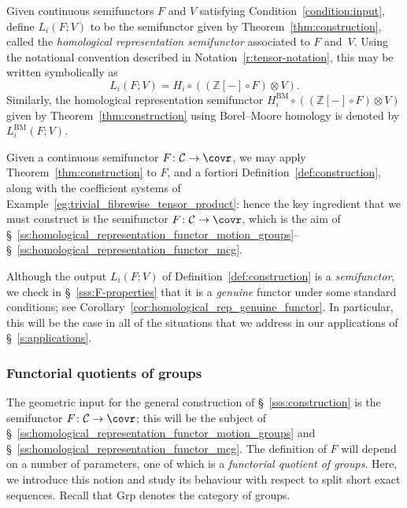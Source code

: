 \documentclass[AHL,Unicode,published]{cedram}
\newcommand{\BM}{\mathrm{BM}}
\newcommand{\groups}{\ensuremath{\mathrm{Grp}}}
\newcommand{\cC}{\mathcal{C}}
\newcommand{\bZ}{\mathbb{Z}}
\begin{document}
\begin{defi}\label{def:construction}
Given continuous semifunctors $F$ and $V$ satisfying Condition~\ref{condition:input}, define $L_{i}(F;V)$ to be the semifunctor given by Theorem~\ref{thm:construction}, called the \emph{homological representation semifunctor} associated to $F$ and~$V$. Using the notational convention described in Notation~\ref{r:tensor-notation}, this may be written symbolically as
\[
L_{i}(F;V) = H_{i} \circ ((\bZ[-] \circ F) \otimes V).
\]
Similarly, the homological representation semifunctor $H^{\BM}_{i} \circ ((\bZ[-] \circ F) \otimes V)$ given by Theorem~\ref{thm:construction} using Borel--Moore homology is denoted by $L^{\BM}_{i}(F;V)$.
\end{defi}

Given a continuous semifunctor $F \colon \cC \to \covr$, we may apply Theorem~\ref{thm:construction} to $F$, and a fortiori Definition~\ref{def:construction}, along with the coefficient systems of Example~\ref{eg:trivial_fibrewise_tensor_product}: hence the key ingredient that we must construct is the semifunctor $F \colon \cC \to \covr$, which is the aim of \S~\ref{ss:homological_representation_functor_motion_groups}--\S~\ref{ss:homological_representation_functor_mcg}.

\begin{rema}\label{rmk:homological_representation_semifunctor_genuine}
Although the output $L_{i}(F;V)$ of Definition~\ref{def:construction} is a \emph{semifunctor}, we check in \S~\ref{sss:F-properties} that it is a \emph{genuine} functor under some standard conditions; see Corollary~\ref{cor:homological_rep_genuine_functor}. In particular, this will be the case in all of the situations that we address in our applications of \S~\ref{s:applications}.
\end{rema}


\subsubsection{Functorial quotients of groups}\label{sss:functorial_quotient_group}

The geometric input for the general construction of \S~\ref{sss:construction} is the semifunctor $F \colon \cC \to \covr$; this will be the subject of \S~\ref{ss:homological_representation_functor_motion_groups} and \S~\ref{ss:homological_representation_functor_mcg}. The definition of $F$ will depend on a number of parameters, one of which is a \emph{functorial quotient of groups}. Here, we introduce this notion and study its behaviour with respect to split short exact sequences. Recall that $\groups$ denotes the category of groups.
\end{document}
